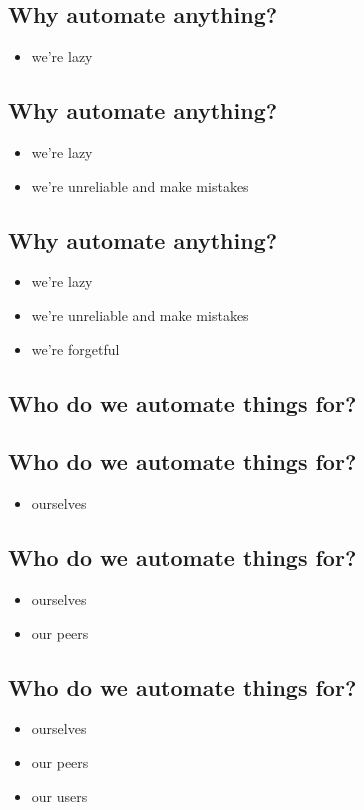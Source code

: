 \documentclass[xga]{xdvislides}
\begin{document}
\subsection{Why automate anything?}
\begin{itemize}
	\item we're lazy
\end{itemize}

\subsection{Why automate anything?}
\begin{itemize}
	\item we're lazy
	\item we're unreliable and make mistakes
\end{itemize}

\subsection{Why automate anything?}
\begin{itemize}
	\item we're lazy
	\item we're unreliable and make mistakes
	\item we're forgetful
\end{itemize}

\subsection{Who do we automate things for?}
\subsection{Who do we automate things for?}
\begin{itemize}
	\item ourselves
\end{itemize}

\subsection{Who do we automate things for?}
\begin{itemize}
	\item ourselves
	\item our peers
\end{itemize}

\subsection{Who do we automate things for?}
\begin{itemize}
	\item ourselves
	\item our peers
	\item our users
\end{itemize}
\end{document}
